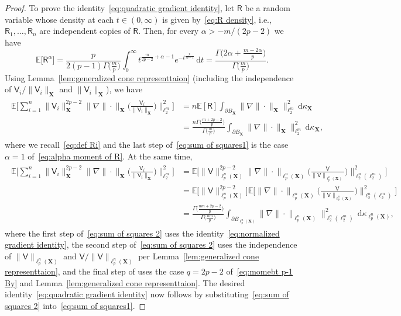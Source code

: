 \documentclass[11pt,reqno]{amsart}
\newcommand{\ud}[0]{\,\mathrm{d}}
\newcommand{\X}{\mathbf X}
\theoremstyle{remark}
\newcommand{\E}{\mathbb{ E}}
\renewcommand{\1}{\mathbf 1}
\newcommand{\V}{\mathsf{V}}
\newcommand{\RR}{\mathsf{R}}
\begin{document}
\begin{proof}
To prove the identity~\eqref{eq:quadratic gradient identity}, let $\RR$ be a random variable whose density at each $t\in (0,\infty)$ is given by~\eqref{eq:R density}, i.e., $\RR_1,\ldots,\RR_n$ are independent copies of $\RR$. Then, for every $\alpha>-m/(2p-2)$ we have
\begin{equation}\label{eq:alpha moment of R}
\E\big[\RR^\alpha\big]=\frac{p}{2(p-1)\Gamma\big(\frac{m}{p}\big)}\int_0^\infty  t^{\frac{m}{2p-2}+\alpha-1}e^{-t^{\frac{p}{2p-2}}}\ud t =\frac{\Gamma\big(2\alpha +\frac{m-2\alpha}{p}\big)}{\Gamma\big(\frac{m}{p}\big)}.
\end{equation}
Using Lemma~\ref{lem:generalized cone representtaion} (including the independence of $\V_i/\|\V_i\|_{\X}$ and $\|\V_i\|_{\X}$), we have
\begin{align}\label{eq:sum of squares1}
\begin{split}
 \E\bigg[\sum_{i=1}^n \|\V_i\|_{\X}^{2p-2}\Big\|\nabla\|\cdot\|_{\X}\Big(\frac{\V_i}{\|\V_i\|_{\X}}\Big)\Big\|_{\ell_2^{m}}^2\bigg]&=n\E[\RR]\int_{\partial B_{\X}} \big\|\nabla\|\cdot\|_{\X}\big\|_{\ell_2^m}^2\ud\kappa_{\X}\\&
 =\frac{n\Gamma\big(\frac{m+2p-2}{p}\big)}{\Gamma\big(\frac{m}{p}\big)}\int_{\partial B_{\X}} \big\|\nabla\|\cdot\|_{\X}\big\|_{\ell_2^m}^2\ud\kappa_{\X},
\end{split}
\end{align}
where we recall~\eqref{eq:def Ri} and  the last step of~\eqref{eq:sum of squares1} is the case $\alpha=1$ of~\eqref{eq:alpha moment of R}. At the same time,
\begin{align}\label{eq:sum of squares 2}
\begin{split}
 \E\bigg[\sum_{i=1}^n \|\V_i\|_{\X}^{2p-2}\Big\|\nabla\|\cdot\|_{\X}\Big(\frac{\V_i}{\|\V_i\|_{\X}}\Big)\Big\|_{\ell_2^{m}}^2\bigg]&=\E\bigg[\|\V\|_{\ell_p^n(\X)}^{2p-2} \Big\|\nabla\|\cdot\|_{\ell_p^n(\X)}\Big(\frac{\V}{\|\V\|_{\ell_p^n(\X)}}\Big)\Big\|_{\ell_2^n(\ell_2^m)}^2\bigg]\\
 &=\E \Big[\|\V\|_{\ell_p^n(\X)}^{2p-2}\Big] \E \bigg[\Big\|\nabla\|\cdot\|_{\ell_p^n(\X)}\Big(\frac{\V}{\|\V\|_{\ell_p^n(\X)}}\Big)\Big\|_{\ell_2^n(\ell_2^m)}^2\bigg]\\&=
 \frac{\Gamma\big(\frac{nm+2p-2}{p}\big)}{\Gamma\big(\frac{nm}{p}\big)}\int_{\partial B_{\ell_p^n(\X)}} \big\|\nabla \|\cdot\|_{\ell_p^n(\X)}\big\|^2_{\ell_2^n(\ell_2^m)}\ud \kappa_{\ell_p^n(\X)},
 \end{split}
\end{align}
where the first step of~\eqref{eq:sum of squares 2} uses the identity~\eqref{eq:normalized gradient identity}, the second step of~\eqref{eq:sum of squares 2} uses the independence of $\|\V\|_{\ell_p^n(\X)}$ and $\V/\|\V\|_{\ell_p^n(\X)}$ per Lemma~\ref{lem:generalized cone representtaion}, and the final step of uses the case $q=2p-2$ of~\eqref{eq:momebt p-1 By} and Lemma~\ref{lem:generalized cone representtaion}. The desired identity~\eqref{eq:quadratic gradient identity} now follows by  substituting~\eqref{eq:sum of squares 2} into~\eqref{eq:sum of squares1}.
\end{proof}
\end{document}
